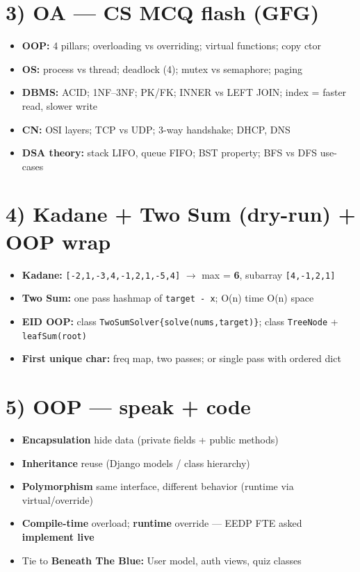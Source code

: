 \documentclass[a4paper,9pt]{extarticle}
\begin{document}
\section{3) OA --- CS MCQ flash (GFG)}
\begin{itemize}
  \item \textbf{OOP:} 4 pillars; overloading vs overriding; virtual functions; copy ctor
  \item \textbf{OS:} process vs thread; deadlock (4); mutex vs semaphore; paging
  \item \textbf{DBMS:} ACID; 1NF--3NF; PK/FK; INNER vs LEFT JOIN; index = faster read, slower write
  \item \textbf{CN:} OSI layers; TCP vs UDP; 3-way handshake; DHCP, DNS
  \item \textbf{DSA theory:} stack LIFO, queue FIFO; BST property; BFS vs DFS use-cases
\end{itemize}

\section{4) Kadane + Two Sum (dry-run) + OOP wrap}
\begin{itemize}
  \item \textbf{Kadane:} \texttt{[-2,1,-3,4,-1,2,1,-5,4]} $\rightarrow$ max = \textbf{6}, subarray \texttt{[4,-1,2,1]}
  \item \textbf{Two Sum:} one pass hashmap of \texttt{target - x}; O(n) time O(n) space
  \item \textbf{EID OOP:} class \texttt{TwoSumSolver\{solve(nums,target)\}}; class \texttt{TreeNode} + \texttt{leafSum(root)}
  \item \textbf{First unique char:} freq map, two passes; or single pass with ordered dict
\end{itemize}

\section{5) OOP --- speak + code}
\begin{itemize}
  \item \textbf{Encapsulation} hide data (private fields + public methods)
  \item \textbf{Inheritance} reuse (Django models / class hierarchy)
  \item \textbf{Polymorphism} same interface, different behavior (runtime via virtual/override)
  \item \textbf{Compile-time} overload; \textbf{runtime} override --- EEDP FTE asked \textbf{implement live}
  \item Tie to \textbf{Beneath The Blue:} User model, auth views, quiz classes
\end{itemize}
\end{document}
